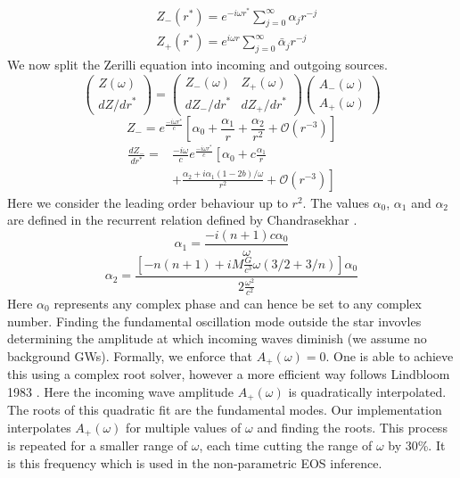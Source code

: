 \documentclass[aps,prd,twocolumn,superscriptaddress,footinbib]{revtex4-1}
\begin{document}
\begin{equation}
\begin{aligned}
&Z_{-}\left(r^{*}\right)=e^{-i \omega r^{*}} \sum_{j=0}^{\infty} \alpha_{j} r^{-j} \\
&Z_{+}\left(r^{*}\right)=e^{i \omega r} \sum_{j=0}^{\infty} \bar{\alpha}_{j} r^{-j}
\end{aligned}
\end{equation}
We now split the Zerilli equation into incoming and outgoing sources. 
\begin{equation}
\left(\begin{array}{c}
Z(\omega) \\
d Z / d r^{*}
\end{array}\right)=\left(\begin{array}{cc}
Z_{-}(\omega) & Z_{+}(\omega) \\
d Z_{-} / d r^{*} & d Z_{+} / d r^{*}
\end{array}\right)\left(\begin{array}{l}
A_{-}(\omega) \\
A_{+}(\omega)
\end{array}\right)
\end{equation}
\begin{equation}
Z_{-}=e^{\frac{-i\omega r^{*}}{c}}\left[\alpha_{0}+\frac{\alpha_{1}}{r}+\frac{\alpha_{2}}{r^{2}}+\mathcal{O}\left(r^{-3}\right)\right]
\end{equation}
\begin{equation}
\begin{aligned}
\frac{d Z_{-}}{d r^{*}}=&\frac{-i \omega}{c} e^{\frac{-i\omega r^{*}}{c}}\left[\alpha_{0}+c\frac{\alpha_{1}}{r}\right.\\
&\left.+\frac{\alpha_{2}+i \alpha_{1}(1-2 b) / \omega}{r^{2}}+\mathcal{O}\left(r^{-3}\right)\right]
\end{aligned}
\end{equation}
Here we consider the leading order behaviour up to $r^2$. The values $\alpha_0$, $\alpha_1$ and $\alpha_2$ are defined in the recurrent relation defined by Chandrasekhar \cite{Chandrasekhar}. 
\begin{equation}
\alpha_{1}=\frac{-i(n+1)c \alpha_{0}}{\omega}
\end{equation}
\begin{equation}
\alpha_{2}=\frac{[-n(n+1)+i M \frac{G}{c^3} \omega(3 / 2+3 / n)] \alpha_{0}}{2 \frac{\omega^{2}}{c^2}}
\end{equation}
Here $\alpha_0$ represents any complex phase and can hence be set to any complex number. Finding the fundamental oscillation mode outside the star invovles determining the amplitude at which incoming waves diminish (we assume no background GWs). Formally, we enforce that $A_+(\omega) = 0$. One is able to achieve this using a complex root solver, however a more efficient way follows Lindbloom 1983 \cite{lindblom1983quadrupole}. Here the incoming wave amplitude $A_+(\omega)$ is quadratically interpolated. The roots of this quadratic fit are the fundamental modes. Our implementation interpolates $A_+(\omega)$ for multiple values of $\omega$ and finding the roots. This process is repeated for a smaller range of $\omega$, each time cutting the range of $\omega$ by 30\%. It is this frequency which is used in the non-parametric EOS inference. 
\end{document}
